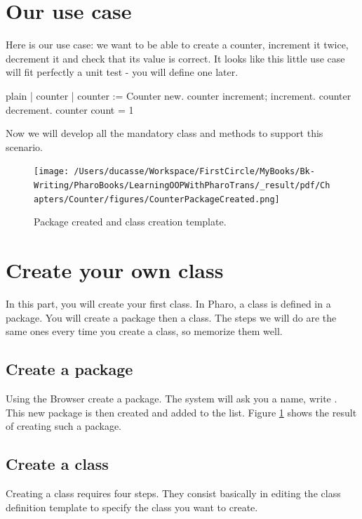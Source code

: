 \documentclass[10pt,twoside,english]{_support/latex/sbabook/sbabook}
\begin{document}
\section{Our use case}
Here is our use case: we want to be able to create a counter, increment it twice, decrement it and check that its value is correct. It looks like this little use case will fit perfectly a unit test - you will define one later. 

\begin{displaycode}{plain}
| counter |
counter := Counter new.
counter increment; increment.
counter decrement.
counter count = 1
\end{displaycode}

Now we will develop all the mandatory class and methods to support this scenario.


\begin{figure}

\begin{center}
\texttt{[image: /Users/ducasse/Workspace/FirstCircle/MyBooks/Bk-Writing/PharoBooks/LearningOOPWithPharoTrans/\_result/pdf/Chapters/Counter/figures/CounterPackageCreated.png]}\caption{Package created and class creation template.\label{figpackageCreated}}\end{center}
\end{figure}

\section{Create your own class}
In this part, you will create your first class. In Pharo, a class is defined in a package. You will create a package then a class. The steps we will do are the same ones every time you create a class, so memorize them well. 
\subsection{Create a package}
Using the Browser create a package. The system will ask you a name, write . This new package is then created and added to the list. Figure \ref{figpackageCreated} shows the result of creating such a package.
\subsection{Create a class}
Creating a class requires four steps. They consist basically in editing the class definition template to specify the class you want to create.
\end{document}
